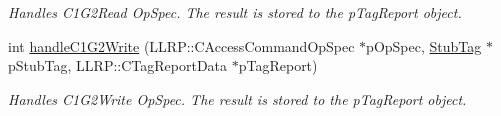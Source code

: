 \begin{DoxyCompactItemize}
\begin{DoxyCompactList}\small\item\em Handles C1\-G2\-Read Op\-Spec. The result is stored to the p\-Tag\-Report object. \end{DoxyCompactList}\item 
int \hyperlink{class_e_l_f_i_n_1_1_access_operation_a019256d2d181eec3688845227ed50a62}{handle\-C1\-G2\-Write} (L\-L\-R\-P\-::\-C\-Access\-Command\-Op\-Spec $\ast$p\-Op\-Spec, \hyperlink{class_e_l_f_i_n_1_1_stub_tag}{Stub\-Tag} $\ast$p\-Stub\-Tag, L\-L\-R\-P\-::\-C\-Tag\-Report\-Data $\ast$p\-Tag\-Report)
\begin{DoxyCompactList}\small\item\em Handles C1\-G2\-Write Op\-Spec. The result is stored to the p\-Tag\-Report object. \end{DoxyCompactList}\end{DoxyCompactItemize}
{\bf }\par
